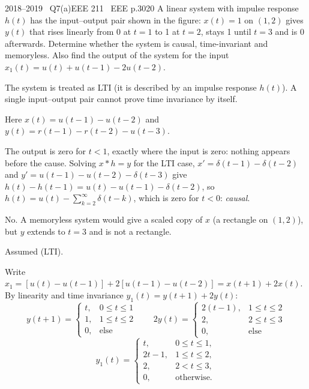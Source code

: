 \begin{qcard}{2018--2019 \textbullet\ Q7(a)}{EEE 211 \textbullet\ EEE p.30}{20}
A linear system with impulse response $h(t)$ has the input--output pair shown in the figure: $x(t)=1$ on $(1,2)$ gives $y(t)$ that rises linearly from 0 at $t=1$ to 1 at $t=2$, stays 1 until $t=3$ and is 0 afterwards. Determine whether the system is causal, time-invariant and memoryless. Also find the output of the system for the input $x_1(t)=u(t)+u(t-1)-2u(t-2)$.
\end{qcard}
\begin{notebox}The system is treated as LTI (it is described by an impulse response $h(t)$). A single input--output pair cannot prove time invariance by itself.\end{notebox}
\begin{solution}
Here $x(t)=u(t-1)-u(t-2)$ and $y(t)=r(t-1)-r(t-2)-u(t-3)$.

 The output is zero for $t<1$, exactly where the input is zero: nothing appears before the cause. Solving $x*h=y$ for the LTI case, $x'=\delta(t-1)-\delta(t-2)$ and $y'=u(t-1)-u(t-2)-\delta(t-3)$ give $h(t)-h(t-1)=u(t)-u(t-1)-\delta(t-2)$, so $h(t)=u(t)-\sum_{k=2}^\infty\delta(t-k)$, which is zero for $t<0$: \emph{causal}.

 No. A memoryless system would give a scaled copy of $x$ (a rectangle on $(1,2)$), but $y$ extends to $t=3$ and is not a rectangle.

 Assumed (LTI).

 Write $x_1=[u(t)-u(t-1)]+2[u(t-1)-u(t-2)]=x(t+1)+2x(t)$. By linearity and time invariance $y_1(t)=y(t+1)+2y(t)$:
\[
y(t+1)=\begin{cases}t,&0\le t\le1\\1,&1\le t\le2\\0,&\text{else}\end{cases}\qquad 2y(t)=\begin{cases}2(t-1),&1\le t\le2\\2,&2\le t\le3\\0,&\text{else}\end{cases}
\]
\[
y_1(t)=\begin{cases}t,&0\le t\le1,\\2t-1,&1\le t\le2,\\2,&2<t\le3,\\0,&\text{otherwise.}\end{cases}
\]
\begin{center}\end{center}
\end{solution}
